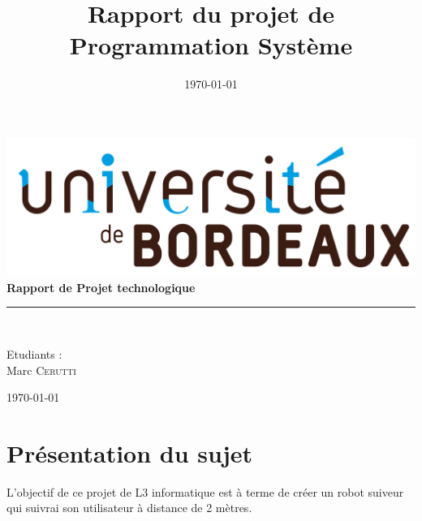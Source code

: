 \documentclass{article}
\title{Rapport du projet de Programmation Système}
\date{\today}
\begin{document}
\begin{titlepage}
 \begin{sffamily}
  \begin{center}
            \includegraphics[scale=0.04]{img/ubx-logo.png}
            \\[2cm]
        
    
    {\huge \bfseries Rapport de Projet technologique\\[0.5cm] }

    \rule{\linewidth}{.5pt}
    \\[2cm]

    \begin{minipage}{0.4\textwidth}
      \begin{flushleft} \large
        \author{}Etudiants :\\
        	Marc \textsc{Cerutti}\\
      \end{flushleft}
    \end{minipage}

    \vfill

    {\large \today}

  \end{center}
  \end{sffamily}
  
\end{titlepage}

\newpage

\tableofcontents

\newpage
\part{Présentation du sujet}

	L'objectif de ce projet de L3 informatique est à terme de créer un robot suiveur qui suivrai son utilisateur à distance de 2 mètres.\\
\end{document}
